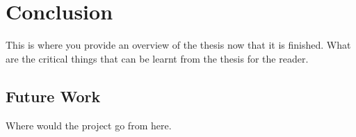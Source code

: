 \chapter{Conclusion}
\label{chap:conclusion}

This is where you provide an overview of the thesis now that it is finished.  What are the critical things that can be learnt from the thesis for the reader.

\section{Future Work}
\label{sec:future}
Where would the project go from here.

